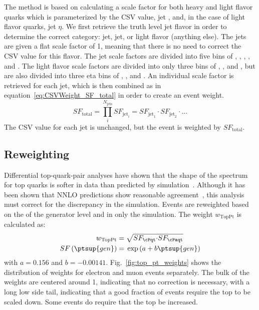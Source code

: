 The method is based on calculating a scale factor for both heavy and light flavor quarks which is parameterized by the CSV value, jet \pt, and, in the case of light flavor quarks, jet $\eta$.
We first retrieve the truth level jet flavor in order to determine the correct category: \cPqb jet, \cPqc jet, or light flavor (anything else).
The \cPqc jets are given a flat scale factor of 1, meaning that there is no need to correct the CSV value for this flavor.
The \cPqb jet scale factors are divided into five \pt bins of \ptlt{40\gev}, \ptrange{40\gev}{60\gev}, \ptrange{60\gev}{100\gev}, \ptrange{100\gev}{160\gev}, and \ptgt{160\gev}.
The light flavor scale factors are divided into only three \pt bins of \ptlt{40\gev}, \ptrange{40\gev}{60\gev}, and \ptgt{60\gev}, but are also divided into three eta bins of , , and .
An individual scale factor is retrieved for each jet, which is then combined as in equation~\ref{eq:CSVWeight_SF_total} in order to create an event weight.
\begin{equation}\label{eq:CSVWeight_SF_total}
  SF_{\mathrm{total}}=\prod_{i}^{N_{\mathrm{jets}}}SF_{\mathrm{jet}_{i}}=SF_{\mathrm{jet}_{1}}{\cdot}SF_{\mathrm{jet}_{2}}{\cdot}...
\end{equation}
The CSV value for each jet is unchanged, but the event is weighted by $SF_{\mathrm{total}}$.

\subsection{\texorpdfstring{\ttbar}{TTbar} Reweighting}
Differential top-quark-pair analyses have shown that the shape of the \pt spectrum for top quarks is softer in data than predicted by simulation~\cite{Chatrchyan:2012saa,TopPtReweighting}.
Although it has been shown that NNLO predictions show reasonable agreement~\cite{Kidonakis2014}, this analysis must correct for the discrepancy in the \ttbar simulation.
Events are reweighted based on the \pt of the generator level \cPqt and \cPaqt in only the \ttbar simulation.
The weight $w_{\mathrm{TopPt}}$ is calculated as:
\begin{align}
  w_{\mathrm{TopPt}} ={}& \sqrt{SF_{\cPqt}{\cdot}SF_{\cPaqt}} \label{eq:TopPtWeight} \\
  SF\left(\ptsup{gen}\right) ={}& \exp\left(a+b\ptsup{gen}\right) \label{eq:TopPtSF}
\end{align}
with $a=0.156$ and $b=-0.00141$.
Fig.~\ref{fig:top_pt_weights} shows the distribution of weights for electron and muon events separately.
The bulk of the weights are centered around 1, indicating that no correction is necessary, with a long low side tail, indicating that a good fraction of events require the top \pt to be scaled down.
Some events do require that the top \pt be increased.

